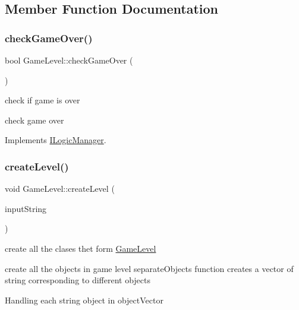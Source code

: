 \subsection{Member Function Documentation}
\mbox{\label{class_game_level_a5abb06b252b4593608aae90dac77d7cd}} 
\subsubsection{\texorpdfstring{check\+Game\+Over()}{checkGameOver()}}
{\footnotesize\ttfamily bool Game\+Level\+::check\+Game\+Over (\begin{DoxyParamCaption}{ }\end{DoxyParamCaption})\hspace{0.3cm}{\ttfamily [virtual]}}



check if game is over 

check game over 

Implements \mbox{\hyperlink{class_i_logic_manager}{I\+Logic\+Manager}}.

\mbox{\label{class_game_level_a4e520fb697c9f7f62daf02b37c31123c}} 
\subsubsection{\texorpdfstring{create\+Level()}{createLevel()}}
{\footnotesize\ttfamily void Game\+Level\+::create\+Level (\begin{DoxyParamCaption}\item[{\mbox{\hyperlink{class_logic_data}{Logic\+Data}}}]{input\+String }\end{DoxyParamCaption})\hspace{0.3cm}{\ttfamily [virtual]}}



create all the clases thet form \mbox{\hyperlink{class_game_level}{Game\+Level}} 

create all the objects in game level separate\+Objects function creates a vector of string corresponding to different objects

Handling each string object in object\+Vector

